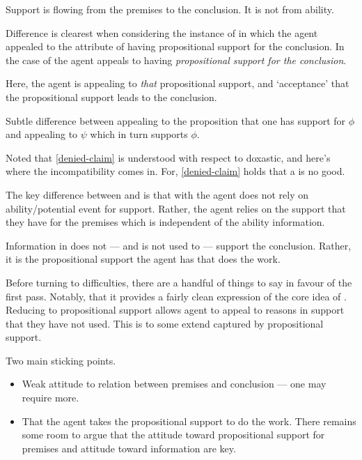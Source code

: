 \begin{note}[Existential]
  Support is flowing from the premises to the conclusion.
  It is not from ability.

  Difference is clearest when considering the instance of \AR{} in which the agent appealed to the attribute of having propositional support for the conclusion.
  In the case of \AR{} the agent appeals to having \emph{propositional support for the conclusion}.

  Here, the agent is appealing to \emph{that} propositional support, and `acceptance' that the propositional support leads to the conclusion.

  Subtle difference between appealing to the proposition that one has support for \(\phi\) and appealing to \(\psi\) which in turn supports \(\phi\).
\end{note}

\begin{note}
  Noted that \ref{denied-claim} is understood with respect to doxastic, and here's where the incompatibility comes in.
  For, \ref{denied-claim} holds that a \future{} is no good.
\end{note}

\begin{note}
  The key difference between \AR{} and \WR{} is that with \WR{} the agent does not rely on ability/potential event for support.
  Rather, the agent relies on the support that they have for the premises which is independent of the ability information.

  Information in \WR{} does not --- and is not used to --- support the conclusion.
  Rather, it is the propositional support the agent has that does the work.
\end{note}

\begin{note}
  Before turning to difficulties, there are a handful of things to say in favour of the first pass.
  Notably, that it provides a fairly clean expression of the core idea of \WR{}.
  Reducing to propositional support allows agent to appeal to reasons in support that they have not used.
  This is to some extend captured by propositional support.

  Two main sticking points.
  \begin{itemize}
  \item Weak attitude to relation between premises and conclusion --- one may require more.
  \item That the agent takes the propositional support to do the work.
    There remains some room to argue that the attitude toward propositional support for premises and attitude toward information are key.
    
  \end{itemize}
\end{note}


